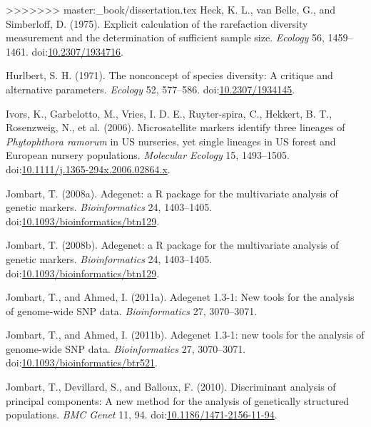 \documentclass[double,12pt]{beavtex}
\begin{document}
>>>>>>> master:_book/dissertation.tex
  \hypertarget{ref-heck1975explicit}{}
  Heck, K. L., van Belle, G., and Simberloff, D. (1975). Explicit
  calculation of the rarefaction diversity measurement and the
  determination of sufficient sample size. \emph{Ecology} 56, 1459--1461.
  doi:\href{https://doi.org/10.2307/1934716}{10.2307/1934716}.
  
  \hypertarget{ref-hurlbert1971nonconcept}{}
  Hurlbert, S. H. (1971). The nonconcept of species diversity: A critique
  and alternative parameters. \emph{Ecology} 52, 577--586.
  doi:\href{https://doi.org/10.2307/1934145}{10.2307/1934145}.
  
  \hypertarget{ref-ivors2006microsatellite}{}
  Ivors, K., Garbelotto, M., Vries, I. D. E., Ruyter-spira, C., Hekkert,
  B. T., Rosenzweig, N., et al. (2006). Microsatellite markers identify
  three lineages of \emph{Phytophthora ramorum} in US nurseries, yet
  single lineages in US forest and European nursery populations.
  \emph{Molecular Ecology} 15, 1493--1505.
  doi:\href{https://doi.org/10.1111/j.1365-294x.2006.02864.x}{10.1111/j.1365-294x.2006.02864.x}.
  
  \hypertarget{ref-Jombart:2008}{}
  Jombart, T. (2008a). Adegenet: a R package for the multivariate analysis
  of genetic markers. \emph{Bioinformatics} 24, 1403--1405.
  doi:\href{https://doi.org/10.1093/bioinformatics/btn129}{10.1093/bioinformatics/btn129}.
  
  \hypertarget{ref-Jombart_2008}{}
  Jombart, T. (2008b). Adegenet: a R package for the multivariate analysis
  of genetic markers. \emph{Bioinformatics} 24, 1403--1405.
  doi:\href{https://doi.org/10.1093/bioinformatics/btn129}{10.1093/bioinformatics/btn129}.
  
  \hypertarget{ref-jombart2011adegenet}{}
  Jombart, T., and Ahmed, I. (2011a). Adegenet 1.3-1: New tools for the
  analysis of genome-wide SNP data. \emph{Bioinformatics} 27, 3070--3071.
  
  \hypertarget{ref-Jombart:2011}{}
  Jombart, T., and Ahmed, I. (2011b). Adegenet 1.3-1: new tools for the
  analysis of genome-wide SNP data. \emph{Bioinformatics} 27, 3070--3071.
  doi:\href{https://doi.org/10.1093/bioinformatics/btr521}{10.1093/bioinformatics/btr521}.
  
  \hypertarget{ref-jombart2010discriminant}{}
  Jombart, T., Devillard, S., and Balloux, F. (2010). Discriminant
  analysis of principal components: A new method for the analysis of
  genetically structured populations. \emph{BMC Genet} 11, 94.
  doi:\href{https://doi.org/10.1186/1471-2156-11-94}{10.1186/1471-2156-11-94}.
  
\end{document}
